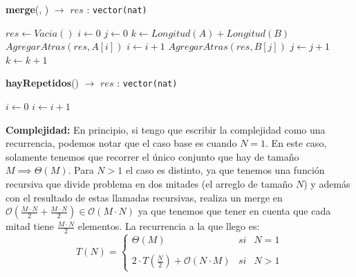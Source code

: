 \documentclass[10pt, a4paper]{article}
\newcommand{\bigO}{\mathcal{O}}
\newcommand{\asignar}[2]{$#1 \gets #2$}
\begin{document}
\begin{algorithm}[H]
	\caption{\textbf{merge}(, ) $\to$ $res$ : \texttt{vector(nat)}}
	\begin{algorithmic}[1]
    \State \asignar{res}{Vacia()}
    \State \asignar{i}{0}
    \State \asignar{j}{0}
    \State \asignar{k}{Longitud(A) + Longitud(B)}
     \Comment{$\bigO(|A| + |B|)$}
        \State $AgregarAtras(res, A[i])$ \Comment{$\bigO(1)$}
        \State \asignar{i}{i + 1}
      \Else
        \State $AgregarAtras(res, B[j])$ \Comment{$\bigO(1)$}
        \State \asignar{j}{j + 1}
      \EndIf
      \State \asignar{k}{k + 1}
    \EndWhile
    \State {}
		\medskip
	\end{algorithmic}
\end{algorithm}

\begin{algorithm}[H]
	\caption{\textbf{hayRepetidos}() $\to$ $res$ : \texttt{vector(nat)}}
	\begin{algorithmic}[1]
    \State \asignar{i}{0}
     \Comment{$\bigO(|A|)$}
        \State {}
      \EndIf
      \State \asignar{i}{i + 1}
    \EndFor
    \State {}
		\medskip
	\end{algorithmic}
\end{algorithm}

\textbf{Complejidad:}
En principio, si tengo que escribir la complejidad como una recurrencia, podemos notar que el caso base es cuando $N = 1$. En este caso, solamente tenemos que recorrer el \'unico conjunto que hay de tama\~no $M \implies \Theta(M)$. Para $N > 1$ el caso es distinto, ya que tenemos una funci\'on recursiva que divide problema en dos mitades (el arreglo de tama\~no $N$) y adem\'as con el resultado de estas llamadas recursivas, realiza un merge en $\bigO(\frac{M \cdot N}{2} + \frac{M \cdot N}{2}) \in \bigO(M \cdot N)$ ya que tenemos que tener en cuenta que cada mitad tiene $\frac{M \cdot N}{2}$ elementos. La recurrencia a la que llego es:
\[
T(N) = \left\{\begin{array}{lcc}
    \Theta(M) &   si  & N = 1 \\
    \\ 2 \cdot T(\frac{N}{2}) + \bigO(N \cdot M)  & si  & N > 1
    \end{array}\right.
\]
\end{document}
